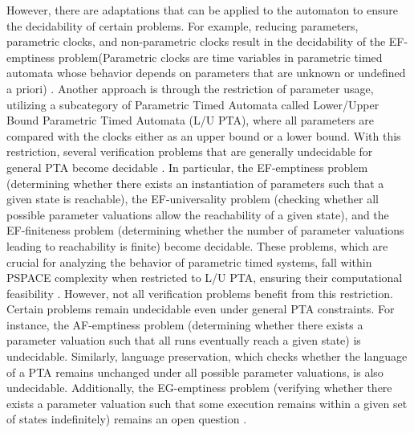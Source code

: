 However, there are adaptations that can be applied to the automaton to ensure the decidability of certain problems. For example, reducing parameters, parametric clocks, and non-parametric clocks result in the decidability of the EF-emptiness problem(Parametric clocks are time variables in parametric timed automata whose behavior depends on parameters that are unknown or undefined a priori) \cite{andre2019whats}. Another approach is through the restriction of parameter usage, utilizing a subcategory of Parametric Timed Automata called Lower/Upper Bound Parametric Timed Automata (L/U PTA), where all parameters are compared with the clocks either as an upper bound or a lower bound. With this restriction, several verification problems that are generally undecidable for general PTA become decidable \cite{andre2019whats}. In particular, the EF-emptiness problem (determining whether there exists an instantiation of parameters such that a given state is reachable), the EF-universality problem (checking whether all possible parameter valuations allow the reachability of a given state), and the EF-finiteness problem (determining whether the number of parameter valuations leading to reachability is finite) become decidable. These problems, which are crucial for analyzing the behavior of parametric timed systems, fall within PSPACE complexity when restricted to L/U PTA, ensuring their computational feasibility \cite{andre2019whats}. However, not all verification problems benefit from this restriction. Certain problems remain undecidable even under general PTA constraints. For instance, the AF-emptiness problem (determining whether there exists a parameter valuation such that all runs eventually reach a given state) is undecidable. Similarly, language preservation, which checks whether the language of a PTA remains unchanged under all possible parameter valuations, is also undecidable. Additionally, the EG-emptiness problem (verifying whether there exists a parameter valuation such that some execution remains within a given set of states indefinitely) remains an open question \cite{andre2019whats}.




